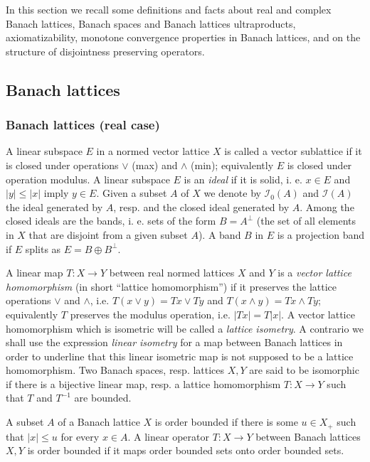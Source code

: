 \documentclass[11pt]{amsart}
\theoremstyle{plain}
\theoremstyle{remark}
\begin{document}
In this section we recall some definitions and facts about real and complex Banach lattices, Banach spaces and Banach lattices ultraproducts, axiomatizability, monotone convergence properties in Banach lattices, and on the structure of disjointness preserving operators.

\subsection{Banach lattices}

\subsubsection{Banach lattices (real case)}
A linear subspace $E$ in a normed vector  lattice $X$ is called a vector sublattice if it is closed under operations $\vee$ (max) and $\wedge$ (min); equivalently $E$ is closed under operation modulus. A linear subspace $E$ is an {\it ideal} if it is solid, i. e. $x\in E$ and $|y|\le |x|$ imply $y\in E$. Given a subset $A$ of $X$ we denote by $\mathcal I_0(A)$ and $\mathcal I(A)$ the ideal generated by $A$, resp.  and  the closed ideal generated by $A$. Among the closed ideals are the bands, i. e. sets of the form $B=A^\perp$ (the set of all elements in $X$ that are  disjoint from a given subset $A$). A band $B$ in $E$ is a projection band if $E$ splits as $E=B\oplus B^\perp$.

A linear map $T: X\to Y$ between real normed lattices $X$ and $Y$ is a {\it vector lattice homomorphism} (in short ``lattice homomorphism'') if it preserves the lattice operations $\vee$ and $\wedge$, i.e. $T(x\vee y)=Tx\vee Ty$ and $T(x\wedge y)=Tx\wedge Ty$; equivalently $T$ preserves the modulus operation, i.e. $|Tx|=T|x|$. A vector lattice homomorphism which is isometric will be called a {\it lattice isometry}. A contrario we shall use the expression  {\it linear isometry} for a map between Banach lattices in order to underline that this linear isometric map is not supposed to be a lattice homomorphism. Two Banach spaces, resp. lattices $X,Y$ are said to be isomorphic if there is a bijective linear map, resp. a lattice homomorphism $T: X\to Y$ such that $T$ and $T^{-1}$ are bounded. 

A subset $A$ of a Banach lattice $X$ is order bounded if there is some $u\in X_+$ such that $|x|\le u$ for every $x\in A$. A linear operator $T:X\to Y$ between Banach lattices $X,Y$ is order bounded if it maps order bounded sets onto order bounded sets.
\end{document}
